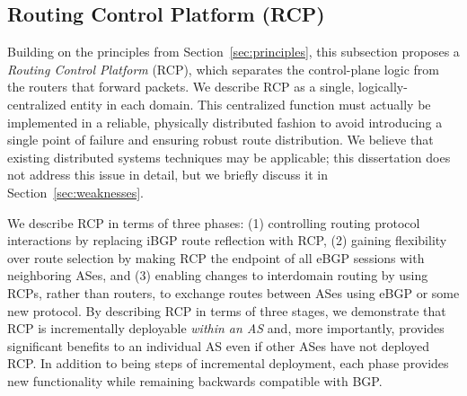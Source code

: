 \subsection{Routing Control Platform (RCP)}\label{sec:arch}
Building on the principles from Section~\ref{sec:principles}, this
subsection proposes a {\em Routing Control Platform} (RCP), which
separates the control-plane logic from the routers that forward packets.
We describe RCP as a single, logically-centralized entity in each
domain. This centralized function must actually be implemented in a
reliable, physically distributed fashion to avoid introducing a single
point of failure and ensuring robust route distribution.  We believe
that existing distributed systems techniques may be applicable; this
dissertation does not address this issue in detail, but we briefly
discuss it in Section~\ref{sec:weaknesses}.

We describe RCP in terms of three phases: (1) controlling routing
protocol interactions by replacing iBGP route reflection with RCP, (2)
gaining flexibility over route selection by making RCP the
endpoint of all eBGP sessions with neighboring ASes, and (3) enabling
changes to interdomain routing by using RCPs, rather than routers, to
exchange routes between ASes using eBGP or some new protocol.
%
By describing RCP in terms of three stages, we demonstrate that RCP is
incrementally deployable {\em within an AS\/} and, more importantly,
provides significant benefits to an individual AS even if other ASes
have not deployed RCP.  In addition to being steps of incremental
deployment, each phase provides  new functionality while
remaining  backwards compatible with BGP.  



